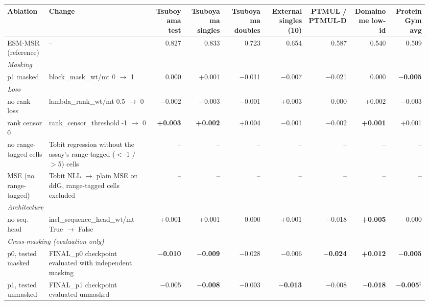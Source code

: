 \begin{tabular}{llrrrrrrr}
\toprule
Ablation & Change & Tsuboyama test & Tsuboyama singles & Tsuboyama doubles & External singles (10) & PTMUL / PTMUL-D & Domainome low-id & ProteinGym avg \\
\midrule
ESM-MSR (reference) & -- & 0.827 & 0.833 & 0.723 & 0.654 & 0.587 & 0.540 & 0.509 \\
\midrule
\multicolumn{9}{l}{\textit{Masking}} \\
p1 masked & block\_mask\_wt/mt 0 $\to$ 1 & 0.000 & +0.001 & $-$0.011 & $-$0.007 & $-$0.021 & 0.000 & \textbf{$-$0.005} \\
\midrule
\multicolumn{9}{l}{\textit{Loss}} \\
no rank loss & lambda\_rank\_wt/mt 0.5 $\to$ 0 & $-$0.002 & $-$0.003 & $-$0.001 & +0.003 & 0.000 & +0.002 & $-$0.003 \\
rank censor 0 & rank\_censor\_threshold -1 $\to$ 0 & \textbf{+0.003} & \textbf{+0.002} & +0.004 & $-$0.001 & $-$0.002 & \textbf{+0.001} & +0.001 \\
no range-tagged cells & Tobit regression without the assay's range-tagged ($<$-1 / $>$5) cells & -- & -- & -- & -- & -- & -- & -- \\
MSE (no range-tagged) & Tobit NLL $\to$ plain MSE on ddG, range-tagged cells excluded & -- & -- & -- & -- & -- & -- & -- \\
\midrule
\multicolumn{9}{l}{\textit{Architecture}} \\
no seq. head & incl\_sequence\_head\_wt/mt True $\to$ False & +0.001 & +0.001 & 0.000 & +0.001 & $-$0.018 & \textbf{+0.005} & 0.000 \\
\midrule
\multicolumn{9}{l}{\textit{Cross-masking (evaluation only)}} \\
p0, tested masked & FINAL\_p0 checkpoint evaluated with independent masking & \textbf{$-$0.010} & \textbf{$-$0.009} & $-$0.028 & $-$0.006 & \textbf{$-$0.024} & \textbf{+0.012} & \textbf{$-$0.005} \\
p1, tested unmasked & FINAL\_p1 checkpoint evaluated unmasked & $-$0.005 & \textbf{$-$0.008} & $-$0.003 & \textbf{$-$0.013} & $-$0.008 & \textbf{$-$0.018} & \textbf{$-$0.005}$^\ddagger$ \\
\bottomrule
\end{tabular}
